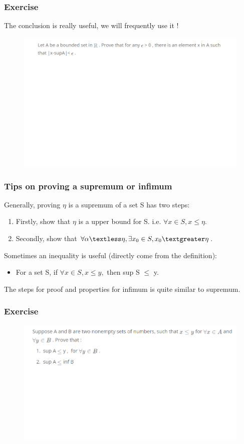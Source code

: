 \documentclass{beamer}
\begin{document}
\begin{frame}
    \frametitle{Exercise}
    The conclusion is really useful, we will frequently use it !
    \begin{figure}[htbp]
        \centering
        \includegraphics[width=12cm]{exercise2.png}
    \end{figure}
\end{frame}


\begin{frame}
    \frametitle{Tips on proving a supremum or infimum}
    Generally, proving $\eta$ is a supremum of a set S has two steps:
    \begin{enumerate}
        \item Firstly, show that $\eta$ is a upper bound for S. i.e. $\forall x \in S, x\leq \eta$.
        \item Secondly, show that $\forall \alpha \textless \eta, \exists x_{0} \in S, x_{0} \textgreater \eta$.
    \end{enumerate}

    Sometimes an inequality is useful (directly come from the definition):
    \begin{itemize}
        \item For a set S, if $\forall x \in S, x \leq y,$ then sup S $\leq$ y.
    \end{itemize}
    The steps for proof and properties for infimum is quite similar to supremum.
\end{frame}

\begin{frame}
    \frametitle{Exercise}
    \begin{figure}[htbp]
        \centering
        \includegraphics[width=12cm]{exercise4.png}
    \end{figure}
\end{frame}
\end{document}

